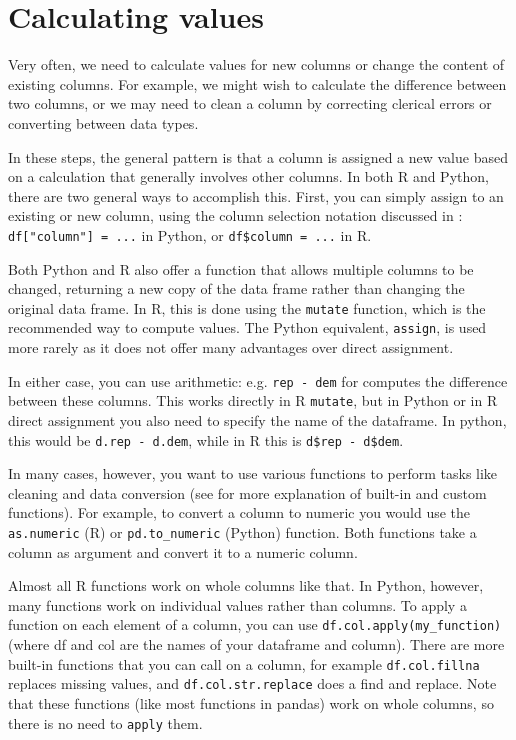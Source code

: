 \section{Calculating values}

Very often, we need to calculate values for new columns or change the content of existing columns.
For example, we might wish to calculate the difference between two columns,
or we may need to clean a column by correcting clerical errors or converting between data types.

In these steps, the general pattern is that a column is assigned a new value based on
a calculation that generally involves other columns.
In both R and Python, there are two general ways to accomplish this.
First, you can simply assign to an existing or new column,
using the column selection notation discussed in :
\verb+df["column"] = ...+ in Python, or \verb+df$column = ...+ in R.

Both Python and R also offer a function that allows multiple columns to be changed,
returning a new copy of the data frame rather than changing the original data frame.
In R, this is done using the \verb+mutate+ function, which is the recommended way to compute values.
The Python equivalent, \verb+assign+, is used more rarely as it does not offer many advantages over direct assignment.

In either case, you can use arithmetic: e.g. \verb|rep - dem| for computes the difference between these columns.
This works directly in R \verb+mutate+,
but in Python or in R direct assignment you also need to specify the name of the dataframe.
In python, this would be \verb+d.rep - d.dem+, while in R this is \verb+d$rep - d$dem+. 

In many cases, however, you want to use various functions to perform tasks like cleaning and data conversion
(see  for more explanation of built-in and custom functions).
For example, to convert a column to numeric you would use the \verb+as.numeric+ (R) or \verb+pd.to_numeric+ (Python) function.
Both functions take a column as argument and convert it to a numeric column.

Almost all R functions work on whole columns like that.
In Python, however, many functions work on individual values rather than columns.
To apply a function on each element of a column, you can use \verb+df.col.apply(my_function)+
(where df and col are the names of your dataframe and column). 
There are more built-in functions that you can call on a column, for example \verb+df.col.fillna+ replaces
missing values, and \verb+df.col.str.replace+ does a find and replace.
Note that these functions (like most functions in pandas) work on whole columns,
so there is no need to \verb+apply+ them. 

